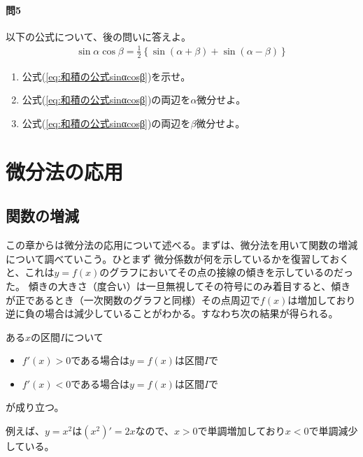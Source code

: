 \documentclass[a4j,dvipdfmx]{jsarticle}
\begin{document}
                \paragraph{問5}以下の公式について、後の問いに答えよ。
                \begin{eqnarray}
                    \sin\alpha\cos\beta=\frac{1}{2}\left\{\sin(\alpha+\beta)+\sin(\alpha-\beta)\right\}\label{eq:和積の公式sinαcosβ}
                \end{eqnarray}
                \begin{enumerate}\setcounter{enumi}{0}\renewcommand{\labelenumi}{(\arabic{enumi})}
                    \item 公式(\ref{eq:和積の公式sinαcosβ})を示せ。
                    \item 公式(\ref{eq:和積の公式sinαcosβ})の両辺を$\alpha$微分せよ。
                    \item 公式(\ref{eq:和積の公式sinαcosβ})の両辺を$\beta$微分せよ。
                \end{enumerate}
                
            \clearpage
            \section{微分法の応用}
                \subsection{関数の増減}
                    この章からは微分法の応用について述べる。まずは、微分法を用いて関数の増減について調べていこう。ひとまず
                    微分係数が何を示しているかを復習しておくと、これは$y=f(x)$のグラフにおいてその点の接線の傾きを示しているのだった。
                    傾きの大きさ（度合い）は一旦無視してその符号にのみ着目すると、傾きが正であるとき（一次関数のグラフと同様）その点周辺で$f(x)$は増加しており
                    逆に負の場合は減少していることがわかる。すなわち次の結果が得られる。
                    \begin{screen}
                        ある$x$の区間$I$について
                        \begin{itemize}
                            \item $f'(x)>0$である場合は$y=f(x)$は区間$I$で
                            \item $f'(x)<0$である場合は$y=f(x)$は区間$I$で
                        \end{itemize}
                        が成り立つ。
                    \end{screen}
                    例えば、$y=x^2$は$(x^2)'=2x$なので、$x>0$で単調増加しており$x<0$で単調減少している。
\end{document}
